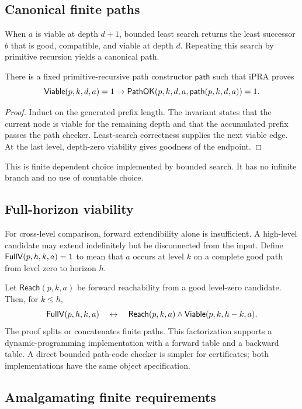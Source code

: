 \subsection{Canonical finite paths}

When \(a\) is viable at depth \(d+1\), bounded least search returns the least
successor \(b\) that is good, compatible, and viable at depth \(d\).  Repeating
this search by primitive recursion yields a canonical path.

\begin{corollary}
\label{cor:least-path}
There is a fixed primitive-recursive path constructor \(\mathsf{path}\) such
that iPRA proves
\[
 \mathsf{Viable}(p,k,d,a)=1\to
 \mathsf{PathOK}(p,k,d,a,\mathsf{path}(p,k,d,a))=1.
\]
\end{corollary}

\begin{proof}
Induct on the generated prefix length.  The invariant states that the current
node is viable for the remaining depth and that the accumulated prefix passes
the path checker.  Least-search correctness supplies the next viable edge.  At
the last level, depth-zero viability gives goodness of the endpoint.
\end{proof}

This is finite dependent choice implemented by bounded search.  It has no
infinite branch and no use of countable choice.

\subsection{Full-horizon viability}

For cross-level comparison, forward extendibility alone is insufficient.  A
high-level candidate may extend indefinitely but be disconnected from the
input.  Define
\(\mathsf{FullV}(p,h,k,a)=1\) to mean that \(a\) occurs at level \(k\) on a complete
good path from level zero to horizon \(h\).

Let \(\mathsf{Reach}(p,k,a)\) be forward reachability from a good level-zero
candidate.  Then, for \(k\le h\),
\[
 \mathsf{FullV}(p,h,k,a)
 \quad\leftrightarrow\quad
 \mathsf{Reach}(p,k,a)\wedge\mathsf{Viable}(p,k,h-k,a).
\]
The proof splits or concatenates finite paths.  This factorization supports a
dynamic-programming implementation with a forward table and a backward table.
A direct bounded path-code checker is simpler for certificates; both
implementations have the same object specification.

\subsection{Amalgamating finite requirements}

